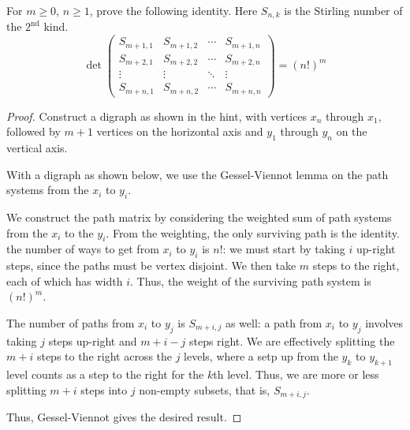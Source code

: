 \documentclass[letterpaper]{article}
\begin{document}
\begin{quest}[\textcolor{red}{Determinant of a matrix of Stirling Numbers}]
    For $m\geq0$, $n\geq 1$, prove the following identity. Here $S_{n,k}$ is the Stirling number of the $2^{\text{nd}}$ kind.
    \[\det\begin{pmatrix}S_{m+1,1}&S_{m+1,2}&\cdots&S_{m+1,n}\\S_{m+2,1}&S_{m+2,2}&\cdots&S_{m+2,n}\\\vdots&\vdots&\ddots&\vdots\\S_{m+n,1}&S_{m+n,2}&\cdots&S_{m+n,n}\end{pmatrix}=(n!)^m\]
\end{quest}
\begin{proof}
    Construct a digraph as shown in the hint, with vertices $x_n$ through $x_1$, followed by $m+1$ vertices on the horizontal axis and $y_1$ through $y_n$ on the vertical axis.

    With a digraph as shown below, we use the Gessel-Viennot lemma on the path systems from the $x_i$ to $y_i$.

    We construct the path matrix by considering the weighted sum of path systems from the $x_i$ to the $y_i$. From the weighting, the only surviving path is the identity. the number of ways to get from $x_i$ to $y_i$ is $n!$: we must start by taking $i$ up-right steps, since the paths must be vertex disjoint. We then take $m$ steps to the right, each of which has width $i$. Thus, the weight of the surviving path system is $(n!)^m$.

    The number of paths from $x_i$ to $y_j$ is $S_{m+i,j}$ as well: a path from $x_i$ to $y_j$ involves taking $j$ steps up-right and $m+i-j$ steps right. We are effectively splitting the $m+i$ steps to the right across the $j$ levels, where a setp up from the $y_k$ to $y_{k+1}$ level counts as a step to the right for the $k$th level. Thus, we are more or less splitting $m+i$ steps into $j$ non-empty subsets, that is, $S_{m+i,j}$.

    Thus, Gessel-Viennot gives the desired result.
\end{proof}
\end{document}
